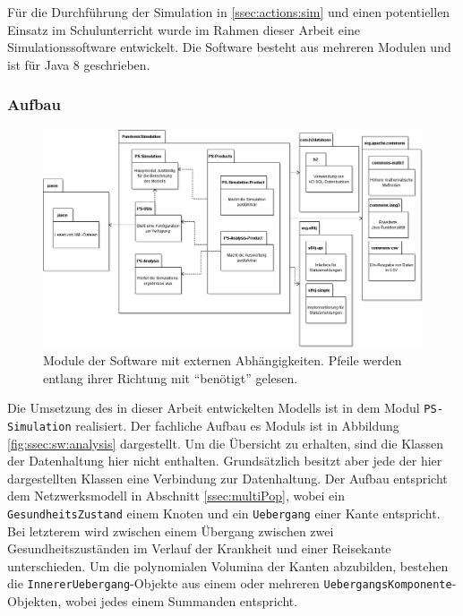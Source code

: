 Für die Durchführung der Simulation in \ref{ssec:actions:sim} und einen potentiellen Einsatz im Schulunterricht wurde im Rahmen dieser Arbeit eine Simulationssoftware entwickelt. Die Software besteht aus mehreren Modulen und ist für Java 8 geschrieben.
\subsubsection*{Aufbau}
\begin{figure}
\includegraphics[width=\textwidth]{res/diagramme/Modul-Aufbau.png}
\caption{Module der Software mit externen Abhängigkeiten. Pfeile werden entlang ihrer Richtung mit ``benötigt'' gelesen.}\label{fig:ssec:sw:moduls}
\end{figure}
Die Umsetzung des in dieser Arbeit entwickelten Modells ist in dem Modul \texttt{PS-Simulation} realisiert. Der fachliche Aufbau es Moduls ist in Abbildung \ref{fig:ssec:sw:analysis} dargestellt. Um die Übersicht zu erhalten, sind die Klassen der Datenhaltung hier nicht enthalten. Grundsätzlich besitzt aber jede der hier dargestellten Klassen eine Verbindung zur Datenhaltung. Der Aufbau entspricht dem Netzwerksmodell in Abschnitt \ref{ssec:multiPop}, wobei ein \texttt{GesundheitsZustand} einem Knoten und ein \texttt{Uebergang} einer Kante entspricht. Bei letzterem wird zwischen einem Übergang zwischen zwei Gesundheitszuständen im Verlauf der Krankheit und einer Reisekante unterschieden. Um die polynomialen Volumina der Kanten abzubilden, bestehen die \texttt{InnererUebergang}-Objekte aus einem oder mehreren \texttt{UebergangsKomponente}-Objekten, wobei jedes einem Summanden entspricht.

